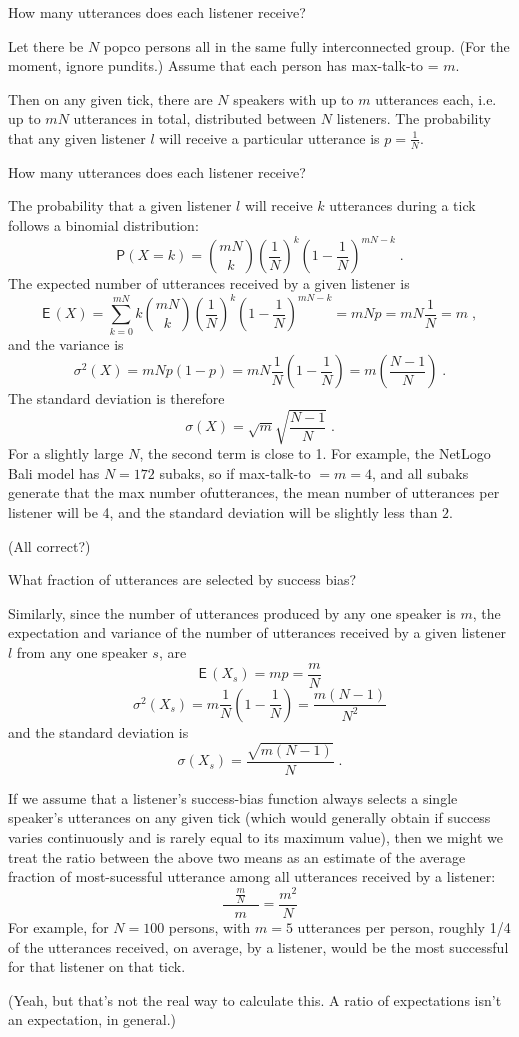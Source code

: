\documentclass[12pt]{article}
\makeatletter
\newcommand{\ie}{i.e.\@\xspace}
\newcommand{\pr}{\mathsf{P}} %
\newcommand{\expct}{\mathsf E\,}
\newcommand{\var}{\sigma^2}
\newcommand{\stdv}{\sigma}
\newcommand{\comb}[2]{{{#1}\choose{#2}}}
\makeatother
\begin{document}

{\Large\sc How many utterances does each listener receive?}

Let there be $N$ popco persons all in the same fully
interconnected group.  (For the moment, ignore pundits.)  Assume
that each person has {\sf max-talk-to} = $m$.

Then on any given tick, there are $N$ speakers with up to $m$ utterances
each, \ie up to $mN$ utterances in total, distributed between $N$
listeners.  The probability that any given listener $l$ will
receive a particular utterance is $p=\frac{1}{N}$.

How many utterances does each listener receive?

The probability that a given listener $l$ will receive $k$
utterances during a tick follows a binomial distribution:
\[
    \pr(X=k) = \comb{mN}{k} \left(\frac{1}{N}\right)^k
    \left(1-\frac{1}{N}\right)^{mN-k} \;.
\]
The expected number of utterances received by a given listener is
\[
    \expct(X) = \sum_{k=0}^{mN}k\comb{mN}{k}
    \left(\frac{1}{N}\right)^k \left(1-\frac{1}{N}\right)^{mN-k}
    = mNp = mN\frac{1}{N} = m \;,
\]
and the variance is
\[
    \var(X) = mNp(1-p) = mN\frac{1}{N}\left(1-\frac{1}{N}\right)
    = m\left(\frac{N-1}{N}\right) \;.
\]
The standard deviation is therefore
\[
    \stdv(X) = \sqrt{m}\sqrt{\frac{N-1}{N}} \;.
\]
For a slightly large $N$, the second term is close to 1.  For
example, the NetLogo Bali model has $N=172$ subaks, so if {\sf
max-talk-to} $=m=4$, and all subaks generate that the max number
ofutterances, the mean number of utterances per listener will be
4, and the standard deviation will be slightly less than $2$.

(All correct?)

\vspace{4ex}


{\Large\sc What fraction of utterances are selected by success bias?}

Similarly, since the number of utterances produced by any one
speaker is $m$, the expectation and variance of the number of utterances
received by a given listener $l$ from any one speaker $s$, are
\[
\expct(X_s) = mp = \frac{m}{N}
\]
%
\[
\var(X_s) = m\frac{1}{N}\left(1 - \frac{1}{N}\right) = \frac{m(N-1)}{N^2}
\]
and the standard deviation is
\[
\stdv(X_s) = \frac{\sqrt{m(N-1)}}{N} \;.
\]

If we assume that a listener's success-bias function always
selects a single speaker's utterances on any given tick (which
would generally obtain if success varies continuously and is
rarely equal to its maximum value), then we might we treat the
ratio between the above two means as an estimate of the average
fraction of most-sucessful utterance among all utterances
received by a listener:
\[
    \frac{\frac{m}{N}}{\;\;\;m\;\;\;} = \frac{m^2}{N}
\]
For example, for $N=100$ persons, with $m=5$ utterances per person,
roughly 1/4 of the utterances received, on average, by a
listener, would be the most successful for that listener on that
tick.

(Yeah, but that's not the real way to calculate this.  A ratio of
expectations isn't an expectation, in general.)
\end{document}
